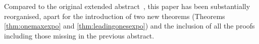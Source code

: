 \documentclass[lettersize,journal]{IEEEtran}
\begin{document}
Compared to the original extended abstract~\cite{CorusOlivetoYazdaniIPH2019}, this paper has been substantially reorganised, apart for the introduction of two new theorems (Theorems \ref{thm:onemaxexpo} and \ref{thm:leadingonesexpo}) and the inclusion of all the proofs including those missing in the previous abstract.
\end{document}

